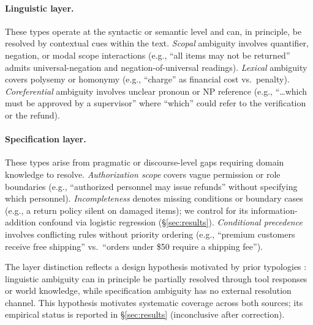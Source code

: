 \paragraph{Linguistic layer.} These types operate at the syntactic or semantic level and can, in principle, be resolved by contextual cues within the text.
\emph{Scopal} ambiguity involves quantifier, negation, or modal scope interactions (e.g., ``all items may not be returned'' admits universal-negation and negation-of-universal readings).
\emph{Lexical} ambiguity covers polysemy or homonymy (e.g., ``charge'' as financial cost vs.\ penalty).
\emph{Coreferential} ambiguity involves unclear pronoun or NP reference (e.g., ``\ldots which must be approved by a supervisor'' where ``which'' could refer to the verification or the refund).

\paragraph{Specification layer.} These types arise from pragmatic or discourse-level gaps requiring domain knowledge to resolve.
\emph{Authorization scope} covers vague permission or role boundaries (e.g., ``authorized personnel may issue refunds'' without specifying which personnel).
\emph{Incompleteness} denotes missing conditions or boundary cases (e.g., a return policy silent on damaged items); we control for its information-addition confound via logistic regression (\S\ref{sec:results}).
\emph{Conditional precedence} involves conflicting rules without priority ordering (e.g., ``premium customers receive free shipping'' vs.\ ``orders under \$50 require a shipping fee'').

The layer distinction reflects a design hypothesis motivated by prior typologies \citep{massey_ambiguity_re_2014,berry_kamsties_2004}: linguistic ambiguity can in principle be partially resolved through tool responses or world knowledge, while specification ambiguity has no external resolution channel. This hypothesis motivates systematic coverage across both sources; its empirical status is reported in \S\ref{sec:results} (inconclusive after correction).

